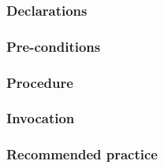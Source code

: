 \def\Subsubsection#1{\subsubsection{#1}}

\Subsubsection{Declarations}

\Subsubsection{Pre-conditions}

\Subsubsection{Procedure}

\Subsubsection{Invocation}

\Subsubsection{Recommended practice}

